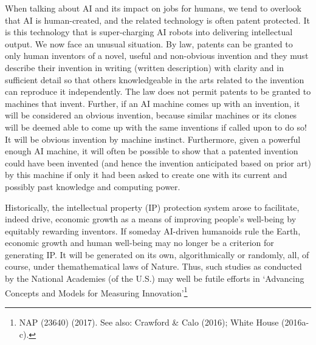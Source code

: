 \begin{multicols}{2}
When talking about AI and its impact on jobs for humans, we tend to overlook that AI is human-created, and the related technology is often patent protected. It is this technology that is super-charging AI robots into delivering intellectual output. We now face an unusual situation. By law, patents can be granted to only human inventors of a novel, useful and non-obvious invention and they must describe their invention in writing (written description) with clarity and in sufficient detail so that others knowledgeable in the arts related to the invention can reproduce it independently. The law does not permit patents to be granted to machines that invent. Further, if an AI machine comes up with an invention, it will be considered an obvious invention, because similar machines or its clones will be deemed able to come up with the same inventions if called upon to do so! It will be obvious invention by machine instinct. Furthermore, given a powerful enough AI machine, it will often be possible to show that a patented invention could have been invented (and hence the invention anticipated based on prior art) by this machine if only it had been asked to create one with its current and possibly past knowledge and computing power.

Historically, the intellectual property (IP) protection system arose to facilitate, indeed drive, economic growth as a means of improving people's well-being by equitably rewarding inventors. If someday AI-driven humanoids rule the Earth, economic growth and human well-being may no longer be a criterion for generating IP. It will be generated on its own, algorithmically or randomly, all, of course, under themathematical laws of Nature. Thus, such studies as conducted by the National Academies (of the U.S.) may well be futile efforts in ‘Advancing Concepts and Models for Measuring Innovation’\footnote{NAP (23640) (2017). See also: Crawford \& Calo (2016); White House (2016a-c).} 


\end{multicols}
